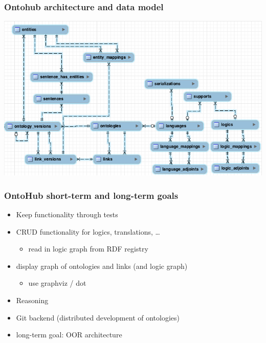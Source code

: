 \documentclass[german]{beamer}
\begin{document}
\begin{frame}
\frametitle{Ontohub architecture and data model}
\includegraphics[width=\textwidth]{DBVisualization.png}
\end{frame}

\begin{frame}
\frametitle{OntoHub short-term and long-term goals}
\begin{itemize}
\item Keep functionality through tests
\item CRUD functionality for logics, translations, \ldots
\begin{itemize}
\item read in logic graph from RDF registry
\end{itemize}
\item display graph of ontologies and links (and logic graph)
\begin{itemize}
\item use graphviz / dot
\end{itemize}
\item Reasoning
\item Git backend (distributed development of ontologies)
\item long-term goal: OOR architecture
\end{itemize}
\end{frame}
\end{document}
